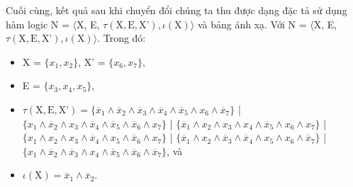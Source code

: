 \documentclass[a4paper,13pt,oneside,openany]{book}
\begin{document}
\begin{flushleft}
	Cuối cùng, kết quả sau khi chuyển đổi chúng ta thu được dạng đặc tả sử dụng hàm logic N = $\langle$X, E, $\tau(\textrm{X}, \textrm{E}, \textrm{X'}), \iota(\textrm{X})\rangle$ và bảng ánh xạ. Với N = $\langle$X, E, $\tau(\textrm{X}, \textrm{E}, \textrm{X'}), \iota(\textrm{X})\rangle$. Trong đó:
	\begin{itemize}
		\item X = $\{x_1, x_2\}$, X' = $\{x_6, x_7\}$,
		\item E = $\{x_3, x_4, x_5\}$,
		\item $\tau(\textrm{X}, \textrm{E}, \textrm{X'}) = \{\overline{x}_1 \land \overline{x}_2 \land \overline{x}_3 \land \overline{x}_4 \land \overline{x}_5 \land x_6 \land \overline{x}_7 \}$ | $\{x_1 \land \overline{x}_2 \land x_3 \land \overline{x}_4 \land \overline{x}_5 \land \overline{x}_6 \land x_7 \}$ | $\{\overline{x}_1 \land x_2 \land x_3 \land x_4 \land \overline{x}_5 \land x_6 \land x_7\}$ | $\{x_1 \land x_2 \land x_3 \land \overline{x}_4 \land x_5 \land \overline{x}_6 \land x_7\}$ | $\{\overline{x}_1 \land x_2 \land \overline{x}_3 \land \overline{x}_4 \land x_5 \land x_6 \land \overline{x}_7\}$ | $\{x_1 \land \overline{x}_2 \land \overline{x}_3 \land x_4 \land \overline{x}_5 \land \overline{x}_6 \land \overline{x}_7\}$, và
		\item $\iota(\textrm{X}) = \overline{x}_1 \land \overline{x}_2$.
	\end{itemize}

\end{flushleft}
\end{document}
